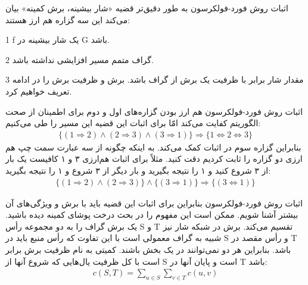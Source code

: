 \begin{itemframe}{اثبات روش فورد-فولکرسون}
\itm
به طور دقیق‌تر قضیه «شار بیشینه، برش کمینه» بیان می‌کند این سه گزاره هم ارز هستند:
\item[1]
f یک شار بیشینه در G باشد.
\item[2]
گراف متمم  مسیر افزایشی نداشته باشد.
\item[3]
مقدار شار برابر با ظرفیت یک برش از گراف باشد.
\itm
برش و ظرفیت برش را در ادامه تعریف خواهیم کرد.
\end{itemframe}
\begin{itemframe}{اثبات روش فورد-فولکرسون}
\itm
هم ارز بودن گزاره‌های اول و دوم برای اطمینان از صحت الگوریتم کفایت می‌کند امّا برای اثبات این قضیه این مسیر را طی می‌کنیم:
\begin{align*}
\{(1 \Rightarrow 2) \land (2 \Rightarrow 3) \land (3 \Rightarrow 1)\}
\Rightarrow
\{1 \Leftrightarrow 2 \Leftrightarrow 3 \}
\end{align*}
\itm
بنابراین گزاره سوم در اثبات کمک می‌کند. به اینکه چگونه از سه عبارت سمت چپ هم ارزی دو گزاره را ثابت کردیم دقت کنید. مثلاً برای اثبات هم‌ارزی ۳ و ۱ کافیست یک بار از ۳ شروع کنید و ۱ را نتیجه بگیرید و بار دیگر از ۳ شروع و ۱ را نتیجه بگیرید:
\begin{align*}
\{(1 \Rightarrow 2) \land (2 \Rightarrow 3)\}
\land
\{(3 \Rightarrow 1)\}
\Rightarrow
\{(3 \Leftrightarrow 1)\}
\end{align*}

\end{itemframe}

\begin{itemframe}{اثبات روش فورد-فولکرسون}
\itm
بنابراین برای اثبات این قضیه باید با برش
 و ویژگی‌های آن بیشتر آشنا شویم. ممکن است این مفهوم را در بحث درخت پوشای کمینه دیده باشید. یک برش گراف را به دو مجموعه رأس S و T تقسیم می‌کند. برش در شبکه شار نیز شبیه به گراف معمولی است با این تفاوت که رأس منبع باید در S و رأس مقصد در T‌ باشد. بنابراین هر دو نمی‌توانند در یک بخش باشند.
\itm
کمیتی به نام ظرفیت برش برابر است با کل ظرفیت یال‌هایی که شروع آنها از S است و پایان آنها در T باشد:
\begin{align*}
c(S, T) = \sum_{u \in S}  \sum_{v \in T} c(u, v)
\end{align*}

\end{itemframe}


